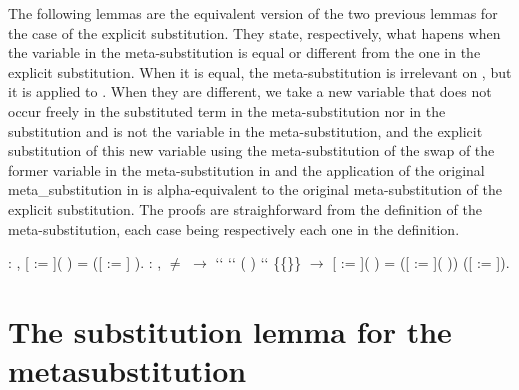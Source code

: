 The following lemmas are the equivalent version of the two previous lemmas for the case of the explicit substitution. They state, respectively, what hapens when the variable in the meta-substitution is equal or different from the one in the explicit substitution. When it is equal, the meta-substitution is irrelevant on , but it is applied to . When they are different, we take a new variable that does not occur freely in the substituted term in the meta-substitution nor in the substitution and is not the variable in the meta-substitution, and the explicit substitution of this new variable using the meta-substitution of the swap of the former variable in the meta-substitution in  and the application of the original meta\_substitution in  is alpha-equivalent to the original meta-substitution of the explicit substitution. The proofs are straighforward from the definition of the meta-substitution, each case being respectively each one in the definition. \newline
\begin{coqdoccode}
\coqdocemptyline
\coqdocnoindent
{}  : \coqdockw{\ensuremath{\forall}}    , [ := ](   ) =    ([ := ] ).\coqdoceol
\coqdocemptyline
\coqdocnoindent
{}  : \coqdockw{\ensuremath{\forall}}      ,  \ensuremath{\not=}  \ensuremath{\rightarrow}  ``   ``  (   ) `` \{\{\}\} \ensuremath{\rightarrow} [ := ](   ) =  ([ := ](   ))  ([ := ]).\coqdoceol
\coqdocemptyline
\end{coqdoccode}
\section{The substitution lemma for the metasubstitution}



